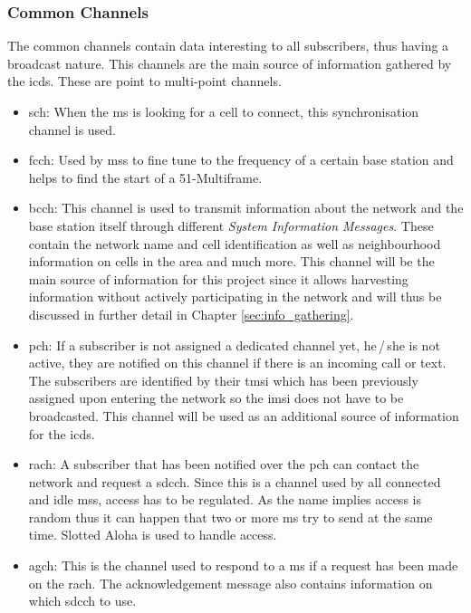 \subsubsection{Common Channels}
\label{sec:common_channels}
The common channels contain data interesting to all subscribers, thus having a broadcast nature.
This channels are the main source of information gathered by the \gls{icds}.
These are point to multi-point channels.
\begin{itemize}
	\item \gls{sch}: When the \gls{ms} is looking for a cell to connect, this synchronisation channel is used.
	\item \gls{fcch}: Used by \glspl{ms} to fine tune to the frequency of a certain base station and helps to find the start of a 51-Multiframe.
	\item \gls{bcch}: This channel is used to transmit information about the network and the base station itself through different \emph{System Information Messages}.
	These contain the network name and cell identification as well as neighbourhood information on cells in the area and much more.
	This channel will be the main source of information for this project since it allows harvesting information without actively participating in the network and will thus be discussed in further detail in Chapter \ref{sec:info_gathering}.
	\item \gls{pch}: If a subscriber is not assigned a dedicated channel yet, \ie he\,/\,she is not active, they are notified on this channel if there is an incoming call or text.
	The subscribers are identified by their \gls{tmsi} which has been previously assigned upon entering the network so the \gls{imsi} does not have to be broadcasted.
	This channel will be used as an additional source of information for the \gls{icds}.
	\item \gls{rach}: A subscriber that has been notified over the \gls{pch} can contact the network and request a \gls{sdcch}.
	Since this is a channel used by all connected and idle \glspl{ms}, access has to be regulated.
	As the name implies access is random thus it can happen that two or more \gls{ms} try to send at the same time.
	Slotted Aloha is used to handle access.
	\item \gls{agch}: This is the channel used to respond to a \gls{ms} if a request has been made on the \gls{rach}.
	The acknowledgement message also contains information on which \gls{sdcch} to use.
\end{itemize}

